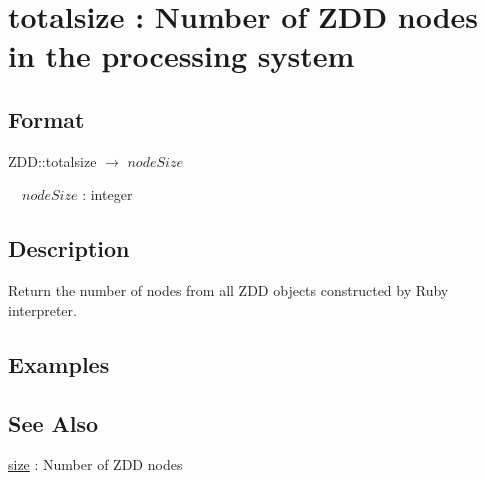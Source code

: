 
\section{totalsize : Number of ZDD nodes in the processing system\label{sect:totalsize}}
\subsection*{Format}
ZDD::totalsize $\rightarrow$ $nodeSize$

~~$nodeSize$ : integer

\subsection*{Description}
Return the number of nodes from all ZDD objects constructed by Ruby interpreter. 

\subsection*{Examples}


\subsection*{See Also}
\hyperref[sect:size]{size} : Number of ZDD nodes


